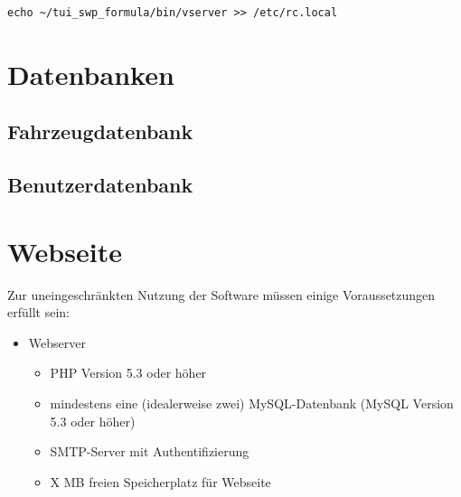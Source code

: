 \documentclass[fontsize = 12pt, paper = a4]{scrreprt}
\begin{document}
\vspace*{4mm}
\begin{lstlisting}[frame=single]
echo ~/tui_swp_formula/bin/vserver >> /etc/rc.local
\end{lstlisting} 
\vspace*{-2mm}

\newpage




\section{Datenbanken}

\subsection{Fahrzeugdatenbank}

\subsection{Benutzerdatenbank}




\newpage


\section{Webseite}

Zur uneingeschränkten Nutzung der Software müssen einige Voraussetzungen erfüllt sein: 

\begin{itemize}

\item Webserver 

\begin{itemize}

\item PHP Version 5.3 oder höher
\item mindestens eine (idealerweise zwei) MySQL-Datenbank (MySQL Version 5.3 oder höher)
\item SMTP-Server mit Authentifizierung
\item X MB freien Speicherplatz für Webseite

\end{itemize}

\end{itemize}
\end{document}
